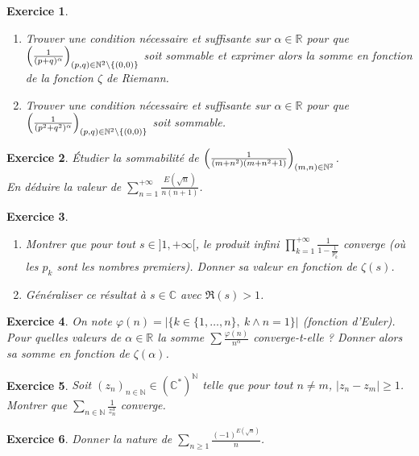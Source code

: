 \documentclass[12pt]{article}
\newtheorem{exercise}{Exercice}[section]
\theoremstyle{remark}
\theoremstyle{remark}
\newcommand{\R}{\mathbb{R}}
\newcommand{\C}{\mathbb{C}}
\newcommand{\N}{\mathbb{N}}
\begin{document}
\begin{exercise}
	\phantom{}
	\begin{enumerate}
		\item Trouver une condition nécessaire et suffisante sur $\alpha\in\R$
		pour que
		$\Bigl(\frac{1}{(p+q)^{\alpha}}\Bigr)_{(p,q)\in\N^{2}\setminus\{(0,0)\}}$
		soit sommable et exprimer alors la somme en fonction de la fonction
		$\zeta$ de Riemann.
		\item Trouver une condition nécessaire et suffisante sur $\alpha\in\R$
		pour que
		$\Bigl(\frac{1}{(p^{2}+q^{2})^{\alpha}}\Bigr)_{(p,q)\in\N^{2}\setminus\{(0,0)\}}$
		soit sommable.
	\end{enumerate}
\end{exercise}

\begin{exercise}
	Étudier la sommabilité de
	$\Bigl(\frac{1}{(m+n^{2})(m+n^{2}+1)}\Bigr)_{(m,n)\in\N^{2}}$.\\
	En déduire la
	valeur de $\sum_{n=1}^{+\infty}\frac{E(\sqrt{n})}{n(n+1)}$.
\end{exercise}

\begin{exercise}
	\phantom{}
	\begin{enumerate}
		\item Montrer que pour tout $s\in]1,+\infty[$, le produit infini
		$\prod_{k=1}^{+\infty}\frac{1}{1-\frac{1}{p_{k}^{s}}}$ converge (où les
		$p_{k}$ sont les nombres premiers). Donner sa valeur en fonction de
		$\zeta(s)$.
		\item Généraliser ce résultat à $s\in\C$ avec $\Re(s)>1$.
	\end{enumerate}
\end{exercise}

\begin{exercise}
	On note $\varphi(n)=\vert\{k\in\{1,\dots,n\},~k\wedge n=1\}\vert$ (fonction d'Euler). Pour quelles
	valeurs de $\alpha\in\R$ la somme $\sum \frac{\varphi(n)}{n^{\alpha}}$
	converge-t-elle ? Donner alors sa somme en fonction de $\zeta(\alpha)$.
\end{exercise}

\begin{exercise}
	Soit $(z_{n})_{n\in\N}\in(\C^{*})^{\N}$ telle que pour tout $n\neq m$,
	$\vert z_{n}-z_{m}\vert\geqslant1$. Montrer que
	$\sum_{n\in\N}\frac{1}{z_{n}^{3}}$ converge.
\end{exercise}

\begin{exercise}
	Donner la nature de $\sum_{n\geqslant1}\frac{(-1)^{E(\sqrt{n})}}{n}$.
\end{exercise}
\end{document}
